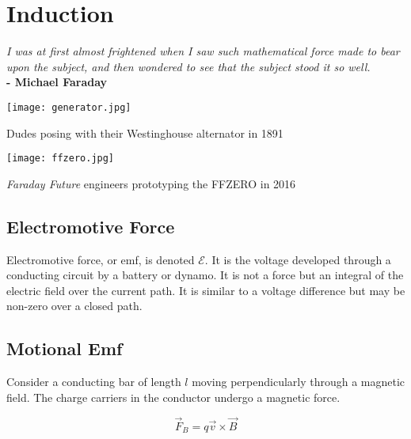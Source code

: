 \chapter{Induction}

\textit{I was at first almost frightened when I saw such mathematical force made to bear upon the subject, and then wondered to see that the subject stood it so well.}\\
\noindent\textbf{-   Michael Faraday}

\vspace{1cm}


\begin{marginfigure}%
  \texttt{[image: generator.jpg]}
  \caption{Dudes posing with their Westinghouse alternator in 1891}
  \label{fig:marginfig}
\end{marginfigure}




\begin{marginfigure}[20pt]%
  \texttt{[image: ffzero.jpg]}
  \caption{\textit{Faraday Future} engineers prototyping the FFZERO in 2016  }
  \label{fig:marginfig}
\end{marginfigure}


\section{Electromotive Force}
Electromotive force, or emf, is denoted $\mathcal{E} $.  It is the voltage developed through a conducting circuit by a battery or dynamo.  It is not a force but an integral of the electric field over the current path.  It is similar to a voltage difference but may be non-zero over a closed path. 

\section{Motional Emf}
Consider a conducting bar of length $l$ moving perpendicularly through a magnetic field.  The charge carriers in the conductor undergo a magnetic force.  

$$\overrightarrow{F}_{B}=q\overrightarrow{v}\times \overrightarrow{B}$$

